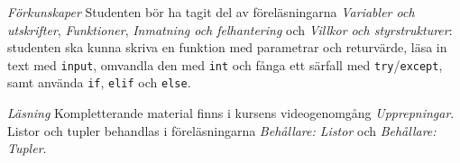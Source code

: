 \emph{Förkunskaper}
Studenten bör ha tagit del av föreläsningarna \emph{Variabler och
utskrifter}, \emph{Funktioner}, \emph{Inmatning och felhantering} och
\emph{Villkor och styrstrukturer}: studenten ska
kunna skriva en funktion med parametrar och returvärde, läsa in text med
\texttt{input}, omvandla den med \texttt{int} och
fånga ett särfall med \texttt{try}/\texttt{except},
samt använda \texttt{if}, \texttt{elif} och
\texttt{else}.

\emph{Läsning}
Kompletterande material finns i kursens videogenomgång \emph{Upprepningar}.
Listor och tupler behandlas i föreläsningarna \emph{Behållare: Listor}
och \emph{Behållare: Tupler}.
